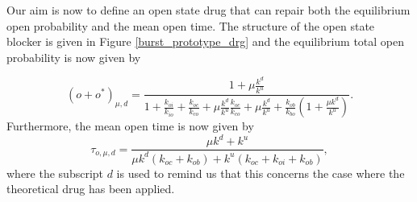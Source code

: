 Our aim is now to define an open state drug that can repair both the
equilibrium open probability and the mean open time. The structure of the open
state blocker is given in Figure \ref{burst_prototype_drg} and the equilibrium total open probability is now
given by 
\begin{comment}
the following system of equations:
\begin{align*}
k_{io}i  &  =k_{oi}o,\text{ }k_{ci}c=k_{ic}i,\text{ }k_{co}c=k_{oc}o,\text{
}k_{bo}b=k_{ob}o,\\
\mu k^{d}c  &  =k^{u}c^{\ast},\text{ }\mu k^{d}o=k^{u}o^{\ast},\text{ }
k_{bo}b^{\ast}=k_{ob}o^{\ast}.
\end{align*}
Since
\begin{equation*}
i=\frac{k_{oi}}{k_{io}}o,\text{ }c=\frac{k_{oc}}{k_{co}}o,\text{ }c^{\ast
}=\frac{\mu k^{d}}{k^{u}}\frac{k_{oc}}{k_{co}}o,\text{ }o^{\ast}=\frac{\mu
k^{d}}{k^{u}}o,\text{ }b=\frac{k_{ob}}{k_{bo}}o,\text{ }b^{\ast}=\frac{k_{ob}
}{k_{bo}}\frac{\mu k^{d}}{k^{u}}o
\end{equation*}
and $o+i+c+c^{\ast}+o^{\ast}+b+b^{\ast}=1,$ 
we obtain the total open probability
\end{comment}
\begin{equation}
\left(  o+o^{\ast}\right)  _{\mu,d}=\frac{1+\mu\frac{k^{d}}{k^{u}}}{1+\frac
{k_{oi}}{k_{io}}+\frac{k_{oc}}{k_{co}}+\mu\frac{k^{d}}{k^{u}}\frac{k_{oc}
}{k_{co}}+\mu\frac{k^{d}}{k^{u}}+\frac{k_{ob}}{k_{bo}}\left(  1+\frac{\mu
k^{d}}{k^{u}}\right)  }. \label{o300}
\end{equation}
Furthermore, the mean open time is now given by
\begin{equation}
\tau_{o,\mu,d}=\frac{\mu k^{d}+k^{u}}{\mu k^{d}\left(  k_{oc}+k_{ob}\right)
+k^{u}\left(  k_{oc}+k_{oi}+k_{ob}\right)  }, \label{mot300}
\end{equation}
where the subscript $d$ is used to remind us that this concerns the case where
the theoretical drug has been applied.

\bigskip

